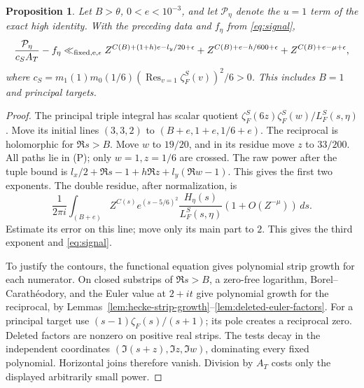 \documentclass[12pt]{article}
\newtheorem{proposition}[theorem]{Proposition}
\begin{document}
\begin{proposition}\label{prop:principal}
Let \(B>\theta\), \(0<e<10^{-3}\), and let
\(\mathcal P_\eta\) denote the \(u=1\) term of the exact high
identity.  With the preceding data and \(f_\eta\) from
\eqref{eq:signal},
\[
 \frac{\mathcal P_\eta}{c_SA_T}-f_\eta
 \ll_{\rm fixed,e,\epsilon}
 Z^{C(B)+(1+h)e-l_y/20+\epsilon}
 +Z^{C(B)+e-h/600+\epsilon}
 +Z^{C(B)+e-\mu+\epsilon},
\]
where \(c_S=m_1(1)m_0(1/6)
(\operatorname{Res}_{v=1}\zeta_F^S(v))^2/6>0\).
This includes \(B=1\) and principal targets.
\end{proposition}
\begin{proof}
The principal triple integral has scalar quotient
\(\zeta_F^S(6z)\zeta_F^S(w)/L_F^S(s,\eta)\).
Move its initial lines \((3,3,2)\) to
\((B+e,1+e,1/6+e)\).  The reciprocal is holomorphic for
\(\Re s>B\).  Move \(w\) to \(19/20\), and in its residue move
\(z\) to \(33/200\).  All paths lie in (P); only \(w=1,z=1/6\)
are crossed.  The raw power after the tuple bound is
\(l_x/2+\Re s-1+h\Re z+l_y(\Re w-1)\).
This gives the first two exponents.  The double residue, after
normalization, is
\[
 \frac1{2\pi i}\int_{(B+e)}
 Z^{C(s)}e^{(s-5/6)^2}\frac{H_\eta(s)}{L_F^S(s,\eta)}
                         (1+O(Z^{-\mu}))\,ds.
\]
Estimate its error on this line; move only its main part to \(2\).
This gives the third exponent and \eqref{eq:signal}.

To justify the contours, the functional equation gives polynomial
strip growth for each numerator.  On closed substrips of
\(\Re s>B\), a zero-free logarithm, Borel--Carath\'eodory, and
the Euler value at \(2+it\) give polynomial growth for the
reciprocal, by Lemmas~\ref{lem:hecke-strip-growth}--\ref{lem:deleted-euler-factors}.
For a principal target use
\((s-1)\zeta_F(s)/(s+1)\); its pole creates a reciprocal zero.
Deleted factors are nonzero on positive real strips.
The tests decay in the independent coordinates
\((\Im(s+z),\Im z,\Im w)\), dominating every fixed polynomial.
Horizontal joins therefore vanish.  Division by \(A_T\) costs
only the displayed arbitrarily small power.
\end{proof}
\end{document}
